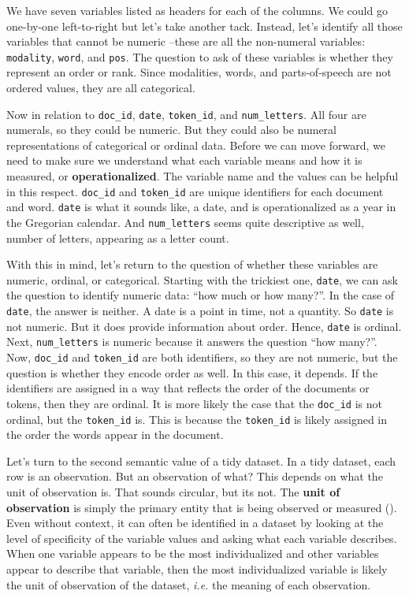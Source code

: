 \documentclass[
  letterpaper,
]{latex/krantz}
\theoremstyle{definition}
\theoremstyle{remark}
\begin{document}
We have seven variables listed as headers for each of the columns. We
could go one-by-one left-to-right but let's take another tack. Instead,
let's identify all those variables that cannot be numeric --these are
all the non-numeral variables: \texttt{modality}, \texttt{word}, and
\texttt{pos}. The question to ask of these variables is whether they
represent an order or rank. Since modalities, words, and parts-of-speech
are not ordered values, they are all categorical.

Now in relation to \texttt{doc\_id}, \texttt{date}, \texttt{token\_id},
and \texttt{num\_letters}. All four are numerals, so they could be
numeric. But they could also be numeral representations of categorical
or ordinal data. Before we can move forward, we need to make sure we
understand what each variable means and how it is measured, or
\textbf{operationalized}. The variable name and the values can be
helpful in this respect. \texttt{doc\_id} and \texttt{token\_id} are
unique identifiers for each document and word. \texttt{date} is what it
sounds like, a date, and is operationalized as a year in the Gregorian
calendar. And \texttt{num\_letters} seems quite descriptive as well,
number of letters, appearing as a letter count.

With this in mind, let's return to the question of whether these
variables are numeric, ordinal, or categorical. Starting with the
trickiest one, \texttt{date}, we can ask the question to identify
numeric data: ``how much or how many?''. In the case of \texttt{date},
the answer is neither. A date is a point in time, not a quantity. So
\texttt{date} is not numeric. But it does provide information about
order. Hence, \texttt{date} is ordinal. Next, \texttt{num\_letters} is
numeric because it answers the question ``how many?''. Now,
\texttt{doc\_id} and \texttt{token\_id} are both identifiers, so they
are not numeric, but the question is whether they encode order as well.
In this case, it depends. If the identifiers are assigned in a way that
reflects the order of the documents or tokens, then they are ordinal. It
is more likely the case that the \texttt{doc\_id} is not ordinal, but
the \texttt{token\_id} is. This is because the \texttt{token\_id} is
likely assigned in the order the words appear in the document.

Let's turn to the second semantic value of a tidy dataset. In a tidy
dataset, each row is an observation. But an observation of what? This
depends on what the unit of observation is. That sounds circular, but
its not. The \textbf{unit of observation} is simply the primary entity
that is being observed or measured (). Even without context, it can often be identified in a dataset by
looking at the level of specificity of the variable values and asking
what each variable describes. When one variable appears to be the most
individualized and other variables appear to describe that variable,
then the most individualized variable is likely the unit of observation
of the dataset, \emph{i.e.} the meaning of each observation.
\end{document}
